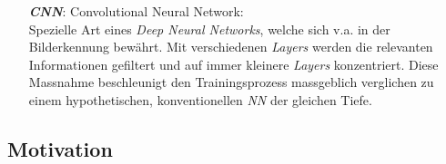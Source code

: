 \begin{itemize}[leftmargin=1.5cm]
	\item[\textbf{\textit{CNN}}:] Convolutional Neural Network:\\
	 Spezielle Art eines \textit{Deep Neural Networks}, welche sich v.a. in der Bilderkennung bewährt. Mit verschiedenen \textit{Layers} werden die relevanten Informationen gefiltert und auf immer kleinere \textit{Layers} konzentriert. Diese Massnahme beschleunigt den Trainingsprozess massgeblich verglichen zu einem hypothetischen, konventionellen \textit{NN} der gleichen Tiefe.
	
\end{itemize}

\subsection{Motivation }














